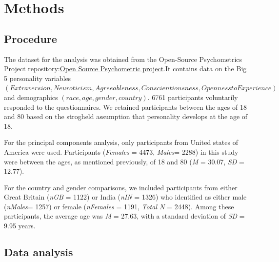 \documentclass[
  english,
  man, fleqn, noextraspace]{apa6}
\begin{document}
\hypertarget{methods}{%
\section{Methods}\label{methods}}

\hypertarget{procedure}{%
\subsection{Procedure}\label{procedure}}

The dataset for the analysis was obtained from the Open-Source Psychometrics Project repository:\href{https://openpsychometrics.org/_rawdata/}{Open Source Psychometric project}.It contains data on the Big 5 personality variables \((Extraversion, Neuroticism, Agreeableness, Conscientiousness, Openness to Experience)\) and demographics \((race, age, gender, country)\). 6761 participants voluntarily responded to the questionnaires. We retained participants between the ages of 18 and 80 based on the strogheld assumption that personality develops at the age of 18.

For the principal components analysis, only participants from United states of America were used. Participants (\emph{Females} = 4473, \emph{Males}= 2288) in this study were between the ages, as mentioned previously, of 18 and 80 (\emph{M} = 30.07, \emph{SD} = 12.77).

For the country and gender comparisons, we included participants from either Great Britain (\emph{nGB} = 1122) or India (\emph{nIN} = 1326) who identified as either male (\emph{nMales}= 1257) or female (\emph{nFemales} = 1191, \emph{Total N} = 2448). Among these participants, the average age was \emph{M} = 27.63, with a standard deviation of \emph{SD} = 9.95 years.

\hypertarget{data-analysis}{%
\subsection{Data analysis}\label{data-analysis}}
\end{document}
